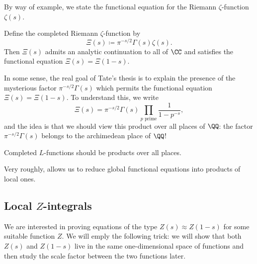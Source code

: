 \documentclass{article}
\begin{document}
By way of example, we state the functional equation for the Riemann $\zeta$-function $\zeta(s)$.
\begin{theorem}[Riemann] \label{thm:riemann-fe}
	Define the completed Riemann $\zeta$-function by
	\[\Xi(s)\coloneqq\pi^{-s/2}\Gamma(s)\zeta(s).\]
	Then $\Xi(s)$ admits an analytic continuation to all of $\CC$ and satisfies the functional equation $\Xi(s)=\Xi(1-s)$.
\end{theorem}
In some sense, the real goal of Tate's thesis is to explain the presence of the mysterious factor $\pi^{-s/2}\Gamma(s)$ which permits the functional equation $\Xi(s)=\Xi(1-s)$. To understand this, we write
\[\Xi(s)=\pi^{-s/2}\Gamma(s)\prod_{p\text{ prime}}\frac1{1-p^{-s}},\]
and the idea is that we should view this product over all places of $\QQ$: the factor $\pi^{-s/2}\Gamma(s)$ belongs to the archimedean place of $\QQ$!
\begin{idea}[Tate] \label{idea:l-function-places}
	Completed $L$-functions should be products over all places.
\end{idea}
Very roughly,  allows us to reduce global functional equations into products of local ones.

\subsection{Local \texorpdfstring{$Z$}{ Z}-integrals}
We are interested in proving equations of the type $Z(s)\approx Z(1-s)$ for some suitable function $Z$. We will emply the following trick: we will show that both $Z(s)$ and $Z(1-s)$ live in the same one-dimensional space of functions and then study the scale factor between the two functions later.
\end{document}
